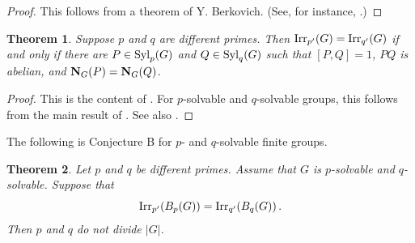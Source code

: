 \documentclass[12pt,leqno,a4paper]{amsart}
\def\syl#1#2{{\rm Syl}_#1(#2)}
\def\norm#1#2{{\bf N}_{#1}(#2)}
\def\irrp#1#2{{\rm Irr}_{#1'}(#2)}
\newtheorem{thm}{Theorem}[section]
\theoremstyle{remark}
\begin{document}
\begin{proof}
This follows from a theorem of Y. Berkovich. (See,
for instance,  \cite[Theorem 7.7]{Na18}.)
\end{proof}




\medskip

\begin{thm}\label{nt}
Suppose $p$ and $q$ are different primes.
Then $\irrp {p}G=\irrp{q} G$ if and only if there are $P \in \syl pG$ and
$Q \in \syl qG$ such that $[P,Q]=1$, $PQ$ is abelian, and $\norm GP=\norm GQ$.
\end{thm}
\medskip

\begin{proof}
This is the content of \cite{NT}. For $p$-solvable and $q$-solvable groups, this follows from the main result of \cite{NWo}. See also \cite{NRS2}. 
\end{proof}

\medskip
The following is Conjecture B for $p$- and $q$-solvable finite groups.

\begin{thm}
 Let $p$
and $q$ be different primes. Assume that $G$ is $p$-solvable
and $q$-solvable.
Suppose that $$\irrp{p}{B_p(G)}=\irrp{q}{B_q(G)} \, .$$ Then $p$ and $q$
do  not divide $|G|$.
\end{thm}

\medskip
\end{document}
